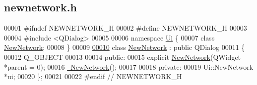 \hypertarget{newnetwork_8h_source}{}\subsection{newnetwork.\+h}
\label{newnetwork_8h_source}

\begin{DoxyCode}
00001 \textcolor{preprocessor}{#ifndef NEWNETWORK\_H}
00002 \textcolor{preprocessor}{#define NEWNETWORK\_H}
00003 
00004 \textcolor{preprocessor}{#include <QDialog>}
00005 
00006 \textcolor{keyword}{namespace }\hyperlink{namespace_ui}{Ui} \{
00007   \textcolor{keyword}{class }\hyperlink{class_new_network}{NewNetwork};
00008 \}
00009 
\hypertarget{newnetwork_8h_source_l00010}{}\hyperlink{class_new_network}{00010} \textcolor{keyword}{class }\hyperlink{class_new_network}{NewNetwork} : \textcolor{keyword}{public} QDialog
00011 \{
00012   Q\_OBJECT
00013   
00014 \textcolor{keyword}{public}:
00015   \textcolor{keyword}{explicit} \hyperlink{class_new_network_a3a8c6341866f1f246848804ed4d0f85e}{NewNetwork}(QWidget *parent = 0);
00016   \hyperlink{class_new_network_aaf5cae0a16a1a46c2b0daecab6ca150f}{~NewNetwork}();
00017   
00018 \textcolor{keyword}{private}:
00019   Ui::NewNetwork *ui;
00020 \};
00021 
00022 \textcolor{preprocessor}{#endif // NEWNETWORK\_H}
\end{DoxyCode}
